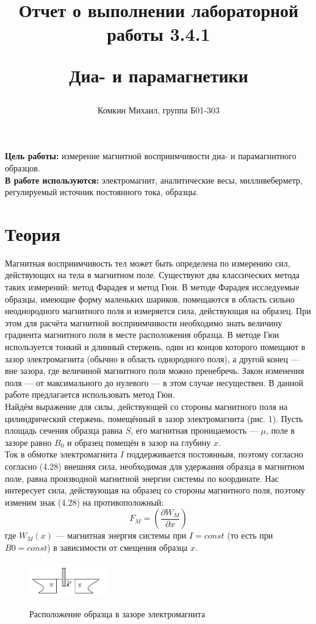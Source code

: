 \documentclass[12pt,a4paper]{article}
\title{
Отчет о выполнении лабораторной работы 3.4.1

Диа- и парамагнетики

}
\author{Комкин Михаил, группа Б01-303}
\begin{document}
\maketitle
\textbf{Цель работы:} измерение магнитной восприимчивости диа- и парамагнитного образцов.
\\
\textbf{В работе используются:} электромагнит, аналитические весы, милливеберметр, регулируемый источник постоянного тока, образцы.


\section*{Теория}

Магнитная восприимчивость тел может быть определена по измерению сил, действующих на тела в магнитном поле. Существуют два
классических метода таких измерений: метод Фарадея и метод Гюи.
В методе Фарадея исследуемые образцы, имеющие форму маленьких
шариков, помещаются в область сильно неоднородного магнитного поля и измеряется сила, действующая на образец. При этом для расчёта
магнитной восприимчивости необходимо знать величину градиента магнитного поля в месте расположения образца. В методе Гюи используется
тонкий и длинный стержень, один из концов которого помещают в зазор
электромагнита (обычно в область однородного поля), а другой конец —
вне зазора, где величиной магнитного поля можно пренебречь. Закон
изменения поля — от максимального до нулевого — в этом случае несуществен. В данной работе предлагается использовать метод Гюи.\\
Найдём выражение для силы, действующей со стороны магнитного поля на
цилиндрический стержень, помещённый
в зазор электромагнита (рис. 1). Пусть
площадь сечения образца равна $S$, его
магнитная проницаемость — $\mu$, поле в зазоре равно $B_0$ и образец помещён в зазор
на глубину $x$.\\
Ток в обмотке электромагнита $I$ поддерживается постоянным, поэтому согласно согласно (4.28) внешняя сила, необходимая для удержания образца в магнитном поле, равна производной магнитной энергии системы по координате. Нас интересует сила,
действующая на образец со стороны магнитного поля, поэтому изменим
знак (4.28) на противоположный:
\[
F_M = \left(\frac{\partial  W_M}{\partial  x}\right)
\]
где $W_M(x)$ — магнитная энергия системы при $I = const$ (то есть при
$B0 = const$) в зависимости от смещения образца $x$.
\begin{figure}[h!]
	\begin{center}
		\includegraphics[width = 0.3\textwidth]{image.png}
		
		\label{fig:facility}
        \caption{ Расположение образца в
        зазоре электромагнита}
	\end{center}
\end{figure}
\end{document}
